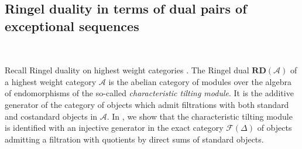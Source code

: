 \documentclass[12pt,a4paper]{amsart}
\newcommand{\aA}{{\mathcal{A}}}
\theoremstyle{definition}
\begin{document}
\vspace{0.3cm}
\subsection{Ringel duality in terms of dual pairs of exceptional sequences}~\\\label{Ring-dual}

Recall Ringel duality on highest weight categories \cite{Rin}. The Ringel dual $\mathbf{RD}(\aA)$ of a highest weight category $\aA$ is the abelian category of modules over the algebra of endomorphisms of the so-called {\it characteristic tilting module}. It is the additive generator of the category of objects which admit filtrations with both standard and costandard objects in $\aA$. In \cite{BodBon4}, we show that the characteristic tilting module is identified with an injective generator in the exact category $\mathcal{F}(\Delta)$ of objects admitting a filtration with quotients by direct sums of standard objects.
\end{document}
